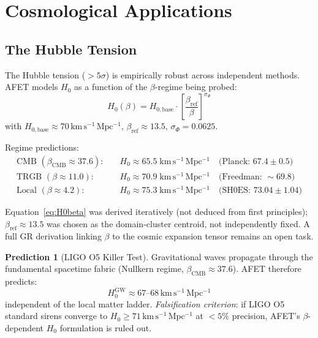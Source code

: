 \documentclass[12pt,a4paper]{article}
\theoremstyle{definition}
\newtheorem{prediction}{Prediction}
\newcommand{\betaref}{\beta_{\mathrm{ref}}}
\newcommand{\betaCMB}{\beta_{\mathrm{CMB}}}
\newcommand{\sigphi}{\sigma_{\Phi}}
\newcommand{\Hbase}{H_{0,\mathrm{base}}}
\begin{document}
\section{Cosmological Applications}

\subsection{The Hubble Tension}

\begin{validated}
The Hubble tension ($>5\sigma$) is empirically robust across independent methods.
AFET models $H_0$ as a function of the $\beta$-regime being probed:
\begin{equation}
  H_0(\beta) = \Hbase \cdot \left[\frac{\betaref}{\beta}\right]^{\sigphi}
  \label{eq:H0beta}
\end{equation}
with $\Hbase \approx 70\,\mathrm{km\,s^{-1}\,Mpc^{-1}}$,
$\betaref \approx 13.5$, $\sigphi = 0.0625$.

Regime predictions:
\begin{align*}
  \text{CMB }   (\betaCMB \approx 37.6): &\quad H_0 \approx 65.5\;\mathrm{km\,s^{-1}\,Mpc^{-1}}
    \quad\text{(Planck: }67.4\pm0.5\text{)} \\
  \text{TRGB }  (\beta \approx 11.0):    &\quad H_0 \approx 70.9\;\mathrm{km\,s^{-1}\,Mpc^{-1}}
    \quad\text{(Freedman: }\sim69.8\text{)} \\
  \text{Local } (\beta \approx 4.2):     &\quad H_0 \approx 75.3\;\mathrm{km\,s^{-1}\,Mpc^{-1}}
    \quad\text{(SH0ES: }73.04\pm1.04\text{)}
\end{align*}
\end{validated}

\begin{hypothesis}
Equation~\eqref{eq:H0beta} was derived iteratively (not deduced from first principles);
$\betaref \approx 13.5$ was chosen as the domain-cluster centroid, not independently
fixed. A full GR derivation linking $\beta$ to the cosmic expansion tensor remains
an open task.
\end{hypothesis}

\begin{prediction}[LIGO O5 Killer Test]
\label{pred:LIGO}
Gravitational waves propagate through the fundamental spacetime fabric
(Nullkern regime, $\betaCMB \approx 37.6$).
AFET therefore predicts:
\[
  H_0^{\mathrm{GW}} \approx 67\text{--}68\,\mathrm{km\,s^{-1}\,Mpc^{-1}}
\]
independent of the local matter ladder.
\textit{Falsification criterion}: if LIGO O5 standard sirens converge to
$H_0 \geq 71\,\mathrm{km\,s^{-1}\,Mpc^{-1}}$ at $<5\%$ precision,
AFET's $\beta$-dependent $H_0$ formulation is ruled out.
\end{prediction}
\end{document}
